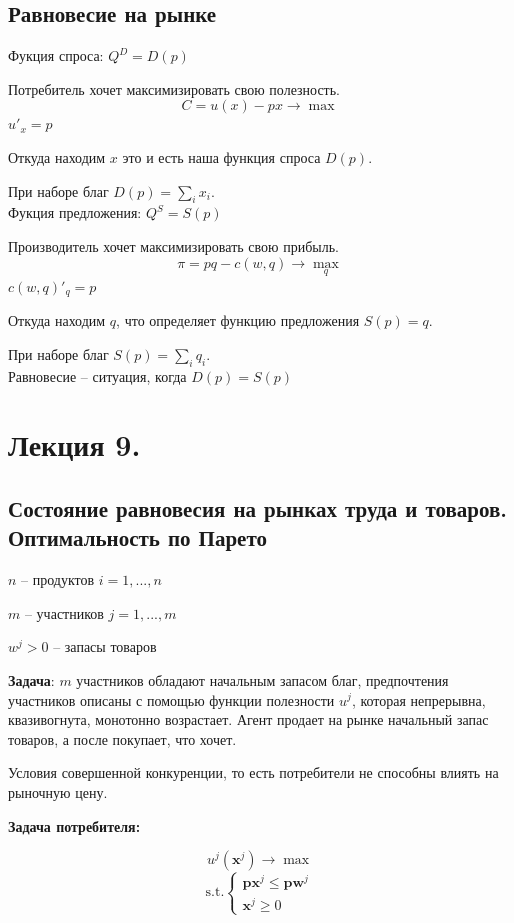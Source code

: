 \documentclass[reqno]{article}
\theoremstyle{definition}
\theoremstyle{definition}
\theoremstyle{definition}
\theoremstyle{definition}
\theoremstyle{definition}
\theoremstyle{definition}
\theoremstyle{definition}
\theoremstyle{definition}
\theoremstyle{definition}
\begin{document}
	\subsection{Равновесие на рынке}
	
	Фукция спроса: $Q^D = D(p)$
	
	Потребитель хочет максимизировать свою полезность.
	$$C = u(x)-px \rightarrow \max$$
	$u'_x = p$
	
	Откуда находим $x$ это и есть наша функция спроса $D(p)$. 
	
	При наборе благ $D(p) = \sum_i x_i$.\\
	
	Фукция предложения: $Q^S = S(p)$
	
	Производитель хочет максимизировать свою прибыль.
	$$\pi = pq-c(w,q) \rightarrow \max_q$$
	$c(w,q)'_q = p$
	
	Откуда находим $q$, что определяет функцию предложения $S(p) = q$.
	
	При наборе благ $S(p)= \sum_i q_i$.\\
	
	Равновесие -- ситуация, когда $D(p)=S(p)$
	
	\newpage
	
	\section{Лекция 9.}
	
	\subsection{Состояние равновесия на рынках труда и товаров. Оптимальность по Парето}
			$n$ -- продуктов $i=1,...,n$
			
			$m$ -- участников $j=1,...,m$
			
			$w^j>0$ -- запасы товаров
			
			\textbf{Задача}: $m$ участников обладают начальным запасом благ, предпочтения участников описаны с помощью функции полезности $u^j$, которая непрерывна, квазивогнута, монотонно возрастает. Агент продает на рынке начальный запас товаров, а после покупает, что хочет. 
			
			Условия совершенной конкуренции, то есть потребители не способны влиять на рыночную цену.
			
			\textbf{Задача потребителя:}
			
			$$u^j(\textbf{x}^j) \rightarrow \max$$
			$$
			\text{s.t.}
			\begin{cases}
				\textbf{px}^j \leq \textbf{pw}^j \\
				\textbf{x}^j \geq 0
			\end{cases}
			$$
			
\end{document}
